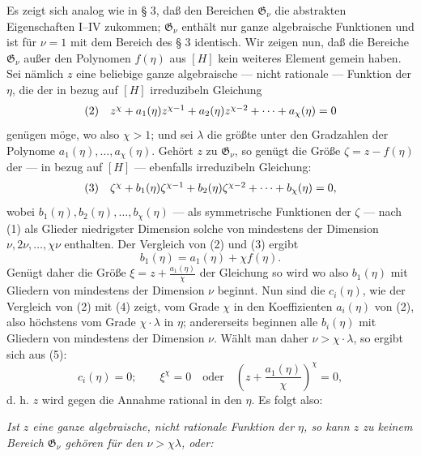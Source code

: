 Es zeigt sich analog wie in § 3, daß den Bereichen $\mathfrak G_\nu$ die
abstrakten Eigenschaften I--IV zukommen; $\mathfrak G_\nu$ enthält nur ganze
algebraische Funktionen und ist für $\nu=1$ mit dem Bereich des § 3 identisch.
Wir zeigen nun, daß die Bereiche $\mathfrak G_\nu$ außer den Polynomen
$f(\eta)$ aus $[H]$ kein weiteres Element gemein haben. Sei nämlich $z$ eine
beliebige ganze algebraische --- nicht rationale --- Funktion der $\eta$, die der
in bezug auf $[H]$ irreduzibeln Gleichung
\[
\begin{array}{@{}l@{\quad}c@{}}
(2)& z^\chi+a_1(\eta)z^{\chi-1}+a_2(\eta)z^{\chi-2}+\cdots+a_\chi(\eta)=0
\end{array}
\]
genügen möge, wo also $\chi>1$; und sei $\lambda$ die größte unter den
Gradzahlen der Polynome $a_1(\eta),\ldots,a_\chi(\eta)$. Gehört $z$ zu
$\mathfrak G_\nu$, so genügt die Größe $\zeta=z-f(\eta)$ der --- in bezug auf
$[H]$ --- ebenfalls irreduzibeln Gleichung:
\[
\begin{array}{@{}l@{\quad}c@{}}
(3)& \zeta^\chi+b_1(\eta)\zeta^{\chi-1}+b_2(\eta)\zeta^{\chi-2}+\cdots+b_\chi(\eta)=0,
\end{array}
\]
wobei $b_1(\eta),b_2(\eta),\ldots,b_\chi(\eta)$ --- als symmetrische Funktionen
der $\zeta$ --- nach (1) als Glieder niedrigster Dimension solche von mindestens
der Dimension $\nu,2\nu,\ldots,\chi\nu$ enthalten. Der Vergleich von (2) und
(3) ergibt
\[
 b_1(\eta)=a_1(\eta)+\chi f(\eta).
\]
Genügt daher die Größe $\xi=z+\frac{a_1(\eta)}{\chi}$ der Gleichung
so wird
wo also $b_1(\eta)$ mit Gliedern von mindestens der Dimension $\nu$ beginnt.
Nun sind die $c_i(\eta)$, wie der Vergleich von (2) mit (4) zeigt, vom Grade
$\chi$ in den Koeffizienten $a_i(\eta)$ von (2), also höchstens vom Grade
$\chi\cdot\lambda$ in $\eta$; andererseits beginnen alle $b_i(\eta)$ mit Gliedern
von mindestens der Dimension $\nu$. Wählt man daher
$\nu>\chi\cdot\lambda$, so ergibt sich aus (5):
\[
 c_i(\eta)=0;\qquad
 \xi^\chi=0\quad\text{oder}\quad
 \left(z+\frac{a_1(\eta)}{\chi}\right)^\chi=0,
\]
d. h. $z$ wird gegen die Annahme rational in den $\eta$. Es folgt also:

\emph{Ist $z$ eine ganze algebraische, nicht rationale Funktion der $\eta$, so
kann $z$ zu keinem Bereich $\mathfrak G_\nu$ gehören für den
$\nu>\chi\lambda$, oder:}

